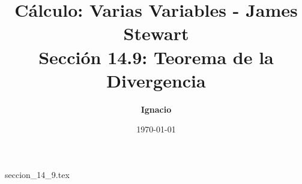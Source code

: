 \documentclass[11pt,spanish,oneside]{report}
\title{\textbf{Cálculo: Varias Variables - James Stewart} \\ \Large Sección 14.9: Teorema de la Divergencia}
\author{\textbf{Ignacio}}
\date{\today}
\begin{document}
\maketitle

{seccion_14_9.tex}
\end{document}
